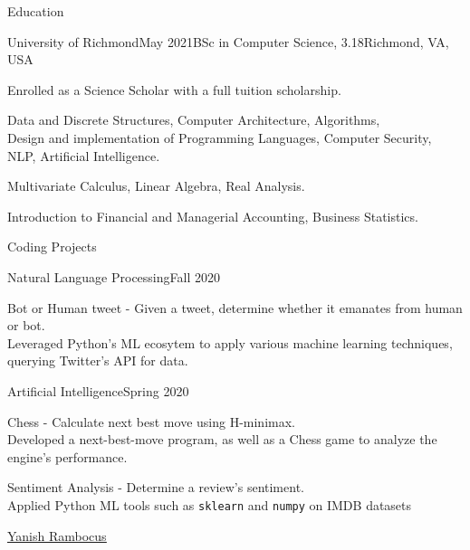 \documentclass{resume} %
\begin{document}
\begin{rSection}{Education}
    \capsdef{////}{\scshape}{0.1pt}{2.5pt}{1pt}
    \begin{rSubsection}{University of Richmond}{May 2021}{BSc in Computer Science, \large{} 3.18}{Richmond, VA, USA}
    \item  Enrolled as a Science Scholar with a full tuition scholarship.
    \item {} Data and Discrete Structures, Computer Architecture, Algorithms,\\
        Design and implementation of Programming Languages, Computer Security, NLP, Artificial Intelligence.
    \item {} Multivariate Calculus, Linear Algebra, Real Analysis.
    \item {} Introduction to Financial and Managerial Accounting, Business Statistics.
    \end{rSubsection}

\end{rSection}

\begin{rSection}{Coding Projects}
    \begin{rSubsection}{Natural Language Processing}{Fall 2020}{}{}
        \item Bot or Human tweet - Given a tweet, determine whether it emanates from human or bot.\\
           Leveraged Python's ML ecosytem to apply various machine learning techniques,
           querying Twitter's API for data.

    \end{rSubsection}

    \begin{rSubsection}{Artificial Intelligence}{Spring 2020}{}{}
        \item Chess - Calculate next best move using H-minimax. \\
            Developed a next-best-move program, as well as a Chess game to analyze the engine's performance.
        \item Sentiment Analysis - Determine a review's sentiment.\\
            Applied Python ML tools such as \texttt{sklearn} and \texttt{numpy} on IMDB datasets
    \end{rSubsection}

\end{rSection}

\vspace{1.4em}

\small  
\noindent
\faLinkedin \hspace{0.2em} \href{https://linkedin.com/in/yanish-rambocus-4a46b7155/}{\underline{Yanish Rambocus}}
\hspace{150pt}
\end{document}

